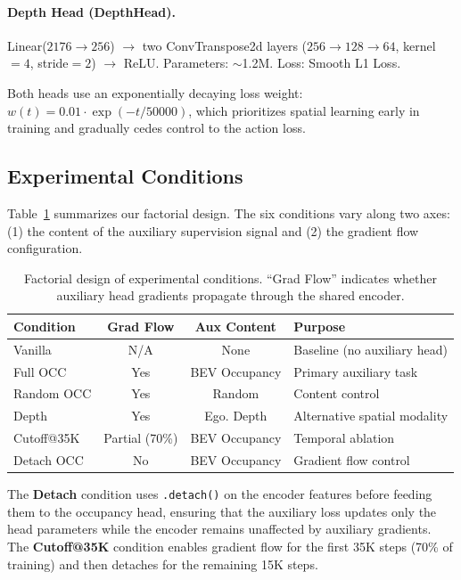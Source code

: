 \documentclass[letterpaper]{article}
\begin{document}
\paragraph{Depth Head (DepthHead).}
Linear($2176 \to 256$) $\to$ two ConvTranspose2d layers ($256 \to 128 \to 64$, kernel$=4$, stride$=2$) $\to$ ReLU.
Parameters: $\sim$1.2M.
Loss: Smooth L1 Loss.

Both heads use an exponentially decaying loss weight: $w(t) = 0.01 \cdot \exp(-t/50000)$, which prioritizes spatial learning early in training and gradually cedes control to the action loss.

\subsection{Experimental Conditions}
\label{sec:conditions}

Table~\ref{tab:conditions} summarizes our factorial design.
The six conditions vary along two axes: (1) the content of the auxiliary supervision signal and (2) the gradient flow configuration.

\begin{table}[h]
\centering
\caption{Factorial design of experimental conditions. ``Grad Flow'' indicates whether auxiliary head gradients propagate through the shared encoder.}
\label{tab:conditions}
\small
\begin{tabular}{lccl}
\toprule
\textbf{Condition} & \textbf{Grad Flow} & \textbf{Aux Content} & \textbf{Purpose} \\
\midrule
Vanilla & N/A & None & Baseline (no auxiliary head) \\
Full OCC & Yes & BEV Occupancy & Primary auxiliary task \\
Random OCC & Yes & Random & Content control \\
Depth & Yes & Ego. Depth & Alternative spatial modality \\
Cutoff@35K & Partial (70\%) & BEV Occupancy & Temporal ablation \\
Detach OCC & No & BEV Occupancy & Gradient flow control \\
\bottomrule
\end{tabular}
\end{table}

The \textbf{Detach} condition uses \texttt{.detach()} on the encoder features before feeding them to the occupancy head, ensuring that the auxiliary loss updates only the head parameters while the encoder remains unaffected by auxiliary gradients.
The \textbf{Cutoff@35K} condition enables gradient flow for the first 35K steps (70\% of training) and then detaches for the remaining 15K steps.
\end{document}
